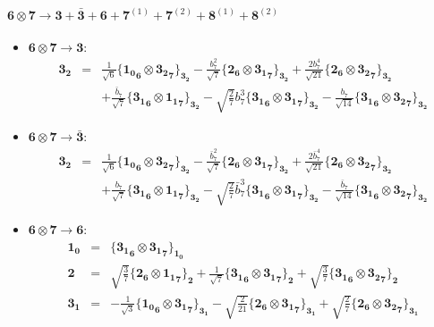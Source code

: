 \documentclass[english]{article}
\newcommand{\subcg}[3]{\big\{ {#1}\otimes{#2}\big\}^{}_{#3}}
\newcommand{\rep}[1]{\mathbf{#1}}
\begin{document}
\paragraph*{\Large $\rep{6}\otimes\rep{7}\to\rep{3}+\rep{\bar{3}}+\rep{6}+\rep{7}^{(1)}+\rep{7}^{(2)}+\rep{8}^{(1)}+\rep{8}^{(2)}$}
\begin{itemize}
\item $\rep{6}\otimes\rep{7}\to\rep{3}$:
\begin{eqnarray*}
\rep{3_2} &=& \frac{1}{\sqrt{6}}\subcg{\rep{1_0}_{\rep{6}}}{\rep{3_2}_{\rep{7}}}{\rep{3_2}}-\frac{b_7^2}{\sqrt{7}}\subcg{\rep{2}_{\rep{6}}}{\rep{3_1}_{\rep{7}}}{\rep{3_2}}+\frac{2 b_7^4}{\sqrt{21}}\subcg{\rep{2}_{\rep{6}}}{\rep{3_2}_{\rep{7}}}{\rep{3_2}} \\ 
 & & +\frac{\bar{b}_7}{\sqrt{7}}\subcg{\rep{3_1}_{\rep{6}}}{\rep{1_1}_{\rep{7}}}{\rep{3_2}}-\sqrt{\frac{2}{7}} b_7^3\subcg{\rep{3_1}_{\rep{6}}}{\rep{3_1}_{\rep{7}}}{\rep{3_2}}-\frac{b_7}{\sqrt{14}}\subcg{\rep{3_1}_{\rep{6}}}{\rep{3_2}_{\rep{7}}}{\rep{3_2}}
\end{eqnarray*}
\item $\rep{6}\otimes\rep{7}\to\rep{\bar{3}}$:
\begin{eqnarray*}
\rep{3_2} &=& \frac{1}{\sqrt{6}}\subcg{\rep{1_0}_{\rep{6}}}{\rep{3_2}_{\rep{7}}}{\rep{3_2}}-\frac{\bar{b}_7^2}{\sqrt{7}}\subcg{\rep{2}_{\rep{6}}}{\rep{3_1}_{\rep{7}}}{\rep{3_2}}+\frac{2 \bar{b}_7^4}{\sqrt{21}}\subcg{\rep{2}_{\rep{6}}}{\rep{3_2}_{\rep{7}}}{\rep{3_2}} \\ 
 & & +\frac{b_7}{\sqrt{7}}\subcg{\rep{3_1}_{\rep{6}}}{\rep{1_1}_{\rep{7}}}{\rep{3_2}}-\sqrt{\frac{2}{7}} \bar{b}_7^3\subcg{\rep{3_1}_{\rep{6}}}{\rep{3_1}_{\rep{7}}}{\rep{3_2}}-\frac{\bar{b}_7}{\sqrt{14}}\subcg{\rep{3_1}_{\rep{6}}}{\rep{3_2}_{\rep{7}}}{\rep{3_2}}
\end{eqnarray*}
\item $\rep{6}\otimes\rep{7}\to\rep{6}$:
\begin{eqnarray*}
\rep{1_0} &=& \subcg{\rep{3_1}_{\rep{6}}}{\rep{3_1}_{\rep{7}}}{\rep{1_0}}
\\
\rep{2} &=& \sqrt{\frac{3}{7}}\subcg{\rep{2}_{\rep{6}}}{\rep{1_1}_{\rep{7}}}{\rep{2}}+\frac{1}{\sqrt{7}}\subcg{\rep{3_1}_{\rep{6}}}{\rep{3_1}_{\rep{7}}}{\rep{2}}+\sqrt{\frac{3}{7}}\subcg{\rep{3_1}_{\rep{6}}}{\rep{3_2}_{\rep{7}}}{\rep{2}}
\\
\rep{3_1} &=& -\frac{1}{\sqrt{3}}\subcg{\rep{1_0}_{\rep{6}}}{\rep{3_1}_{\rep{7}}}{\rep{3_1}}-\sqrt{\frac{2}{21}}\subcg{\rep{2}_{\rep{6}}}{\rep{3_1}_{\rep{7}}}{\rep{3_1}}+\sqrt{\frac{2}{7}}\subcg{\rep{2}_{\rep{6}}}{\rep{3_2}_{\rep{7}}}{\rep{3_1}} \\ 

\end{eqnarray*}
\end{itemize}
\end{document}
